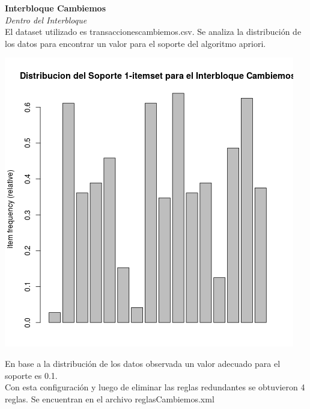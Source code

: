 \documentclass{endm}
\begin{document}
\newpage 

\textbf{Interbloque Cambiemos}\\

\textit{Dentro del Interbloque} \\

El dataset utilizado es transaccionescambiemos.csv. Se analiza la distribución de los datos para encontrar un valor para el soporte del algoritmo apriori. \\

\begin{center}
\includegraphics[scale=0.4]{graficos/soportesCambiemos.png}
\end{center}

En base a la distribución de los datos observada un valor adecuado para el soporte es 0.1.\\

Con esta configuración y luego de eliminar las reglas redundantes se obtuvieron 4 reglas. Se encuentran en el archivo reglasCambiemos.xml  \\
\end{document}
